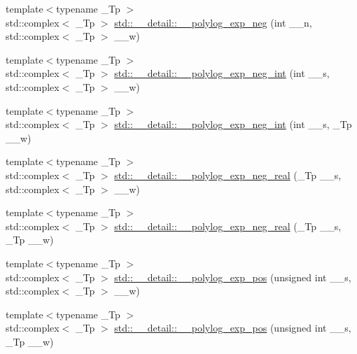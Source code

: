 \begin{DoxyCompactItemize}
\item 
{\footnotesize template$<$typename \+\_\+\+Tp $>$ }\\std\+::complex$<$ \+\_\+\+Tp $>$ \hyperlink{namespacestd_1_1____detail_a313ae48e1c4ed3c5296c8e45614af3d5}{std\+::\+\_\+\+\_\+detail\+::\+\_\+\+\_\+polylog\+\_\+exp\+\_\+neg} (int \+\_\+\+\_\+n, std\+::complex$<$ \+\_\+\+Tp $>$ \+\_\+\+\_\+w)
\item 
{\footnotesize template$<$typename \+\_\+\+Tp $>$ }\\std\+::complex$<$ \+\_\+\+Tp $>$ \hyperlink{namespacestd_1_1____detail_a02b154619b2e4d0bf50dc303370d74cd}{std\+::\+\_\+\+\_\+detail\+::\+\_\+\+\_\+polylog\+\_\+exp\+\_\+neg\+\_\+int} (int \+\_\+\+\_\+s, std\+::complex$<$ \+\_\+\+Tp $>$ \+\_\+\+\_\+w)
\item 
{\footnotesize template$<$typename \+\_\+\+Tp $>$ }\\std\+::complex$<$ \+\_\+\+Tp $>$ \hyperlink{namespacestd_1_1____detail_a7a186c84c1673a2beabba25c91119c66}{std\+::\+\_\+\+\_\+detail\+::\+\_\+\+\_\+polylog\+\_\+exp\+\_\+neg\+\_\+int} (int \+\_\+\+\_\+s, \+\_\+\+Tp \+\_\+\+\_\+w)
\item 
{\footnotesize template$<$typename \+\_\+\+Tp $>$ }\\std\+::complex$<$ \+\_\+\+Tp $>$ \hyperlink{namespacestd_1_1____detail_a6320926219e1a9a653d9a793c7a3ad37}{std\+::\+\_\+\+\_\+detail\+::\+\_\+\+\_\+polylog\+\_\+exp\+\_\+neg\+\_\+real} (\+\_\+\+Tp \+\_\+\+\_\+s, std\+::complex$<$ \+\_\+\+Tp $>$ \+\_\+\+\_\+w)
\item 
{\footnotesize template$<$typename \+\_\+\+Tp $>$ }\\std\+::complex$<$ \+\_\+\+Tp $>$ \hyperlink{namespacestd_1_1____detail_a65df07847bbb3c92518449fbc5787870}{std\+::\+\_\+\+\_\+detail\+::\+\_\+\+\_\+polylog\+\_\+exp\+\_\+neg\+\_\+real} (\+\_\+\+Tp \+\_\+\+\_\+s, \+\_\+\+Tp \+\_\+\+\_\+w)
\item 
{\footnotesize template$<$typename \+\_\+\+Tp $>$ }\\std\+::complex$<$ \+\_\+\+Tp $>$ \hyperlink{namespacestd_1_1____detail_a0327d2970eba3a0a2d73c71c7a77701c}{std\+::\+\_\+\+\_\+detail\+::\+\_\+\+\_\+polylog\+\_\+exp\+\_\+pos} (unsigned int \+\_\+\+\_\+s, std\+::complex$<$ \+\_\+\+Tp $>$ \+\_\+\+\_\+w)
\item 
{\footnotesize template$<$typename \+\_\+\+Tp $>$ }\\std\+::complex$<$ \+\_\+\+Tp $>$ \hyperlink{namespacestd_1_1____detail_ab13a4be6685dd222b654da3297342d7e}{std\+::\+\_\+\+\_\+detail\+::\+\_\+\+\_\+polylog\+\_\+exp\+\_\+pos} (unsigned int \+\_\+\+\_\+s, \+\_\+\+Tp \+\_\+\+\_\+w)

\end{DoxyCompactItemize}
